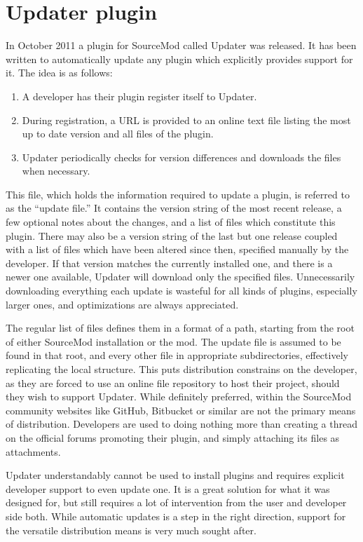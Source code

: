 \section{Updater plugin}
\label{updater-plugin}

In October 2011 a plugin for SourceMod called Updater \cite{alliedmodders-updater} was released.
It has been written to automatically update any plugin which explicitly provides support for it.
The idea is as follows:

\begin{enumerate}
    \item A developer has their plugin register itself to Updater.
    \item During registration, a URL is provided to an online text file listing the most up to date version and all files of the plugin.
    \item Updater periodically checks for version differences and downloads the files when necessary.
\end{enumerate}

This file, which holds the information required to update a plugin, is referred to as the ``update file.''
It contains the version string of the most recent release, a few optional notes about the changes, and a list of files which constitute this plugin.
There may also be a version string of the last but one release coupled with a list of files which have been altered since then, specified manually by the developer.
If that version matches the currently installed one, and there is a newer one available, Updater will download only the specified files.
Unnecessarily downloading everything each update is wasteful for all kinds of plugins, especially larger ones, and optimizations are always appreciated.

The regular list of files defines them in a format of a path, starting from the root of either SourceMod installation or the mod.
The update file is assumed to be found in that root, and every other file in appropriate subdirectories, effectively replicating the local structure.
This puts distribution constrains on the developer, as they are forced to use an online file repository to host their project, should they wish to support Updater.
While definitely preferred, within the SourceMod community websites like GitHub, Bitbucket or similar are not the primary means of distribution.
Developers are used to doing nothing more than creating a thread on the official forums promoting their plugin, and simply attaching its files as attachments.

Updater understandably cannot be used to install plugins and requires explicit developer support to even update one.
It is a great solution for what it was designed for, but still requires a lot of intervention from the user and developer side both.
While automatic updates is a step in the right direction, support for the versatile distribution means is very much sought after.

